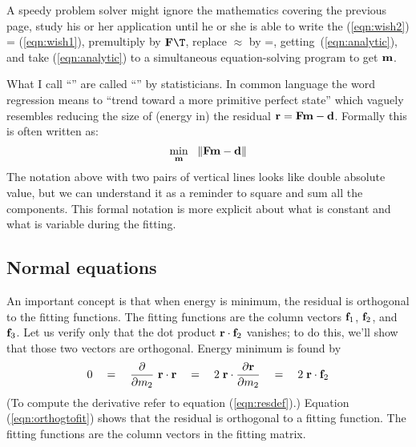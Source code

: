 \par
A speedy problem solver might
ignore the mathematics covering the previous page,
study his or her application until he or she
is able to write the 
(\ref{eqn:wish2}) = (\ref{eqn:wish1}),
premultiply by $\bold F\T$,
replace $\approx$ by =,
getting~(\ref{eqn:analytic}),
and take
(\ref{eqn:analytic})
to a simultaneous equation-solving program to get $\bold m$.

\par
What I call ``'' are called
``'' by statisticians.
In common language the word regression means
to ``trend toward a more primitive perfect state''
which vaguely resembles reducing the size of (energy in)
the residual $\bold r = \bold F \bold m - \bold d $.
Formally this is often written as:
\begin{equation}
\min_{\bold m} \ \  \| \bold F \bold m - \bold d \| 
\label{eqn:norm}
\end{equation}
The notation above with two pairs of vertical lines
looks like double absolute value,
but we can understand it as a reminder to square and sum all the components.
This formal notation is more explicit
about what is constant and what is variable during the fitting.

\subsection{Normal equations}
\par

An important concept is that when energy is minimum,
the residual is orthogonal to the fitting functions.
The fitting functions are the column vectors
$\bold f_1$, $\bold f_2$, and $\bold f_3$.
Let us verify only that the dot product $ \bold r \cdot \bold f_2 $ vanishes;
to do this, we'll show
that those two vectors are orthogonal.
Energy minimum is found by
\begin{equation}
0  \quad = \quad {\partial\over \partial m_2}\ \bold r \cdot \bold r
   \quad = \quad 2\; \bold r \cdot {\partial \bold r\over \partial m_2}
   \quad = \quad 2\; \bold r \cdot \bold f_2
\label{eqn:orthogtofit}
\end{equation}
(To compute the derivative refer to equation (\ref{eqn:resdef}).)
Equation (\ref{eqn:orthogtofit}) shows that
the residual is orthogonal to a fitting function.
The fitting functions are the column vectors in the fitting matrix.

